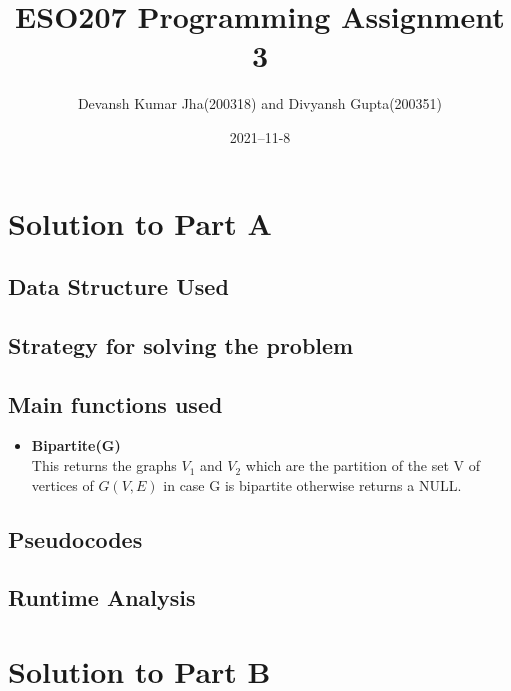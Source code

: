 \documentclass[20pt]{article}
\title{ESO207 Programming Assignment 3}
\author{Devansh Kumar Jha(200318) and Divyansh Gupta(200351)}
\date{2021–11-8}
\begin{document}
\maketitle

\section{Solution to Part A}
\subsection{Data Structure Used}

\subsection{Strategy for solving the problem}

\subsection{Main functions used}
\begin{itemize}
\item \textbf{Bipartite(G)} \\
This returns the graphs $V_1$ and $V_2$ which are the partition of the set V of vertices of $G(V,E)$ in case G is bipartite otherwise returns a NULL.

\end{itemize}

\subsection{Pseudocodes}

\subsection{Runtime Analysis}

\section{Solution to Part B}
\end{document}

